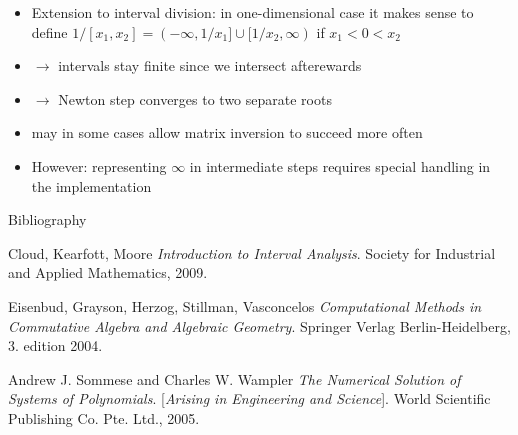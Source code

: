 \documentclass[german,10pt,xcolor=colortbl,compress]{beamer}
\begin{document}
\begin{frame}
    \begin{itemize}
        \item Extension to interval division: in one-dimensional case it makes sense to
            define $1/[x_1, x_2] = (-\infty, 1/x_1] \cup [1/x_2, \infty)$ if $x_1 < 0 <
            x_2$
        \item[]$\rightarrow$ intervals stay finite since we intersect afterewards
        \item[]$\rightarrow$ Newton step converges to two separate roots
        \item may in some cases allow matrix inversion to succeed more often
        \item However: representing $\infty$ in intermediate steps requires special
            handling in the implementation
    \end{itemize}
\end{frame}


\begin{frame}{Bibliography}
    
    \begin{thebibliography}{9}
         Cloud, Kearfott, Moore
            \textit{Introduction to Interval Analysis}.
            Society for Industrial and Applied Mathematics, 2009.


         Eisenbud, Grayson, Herzog, Stillman, Vasconcelos
            \textit{Computational Methods in Commutative Algebra and Algebraic Geometry}.
            Springer Verlag Berlin-Heidelberg, 3. edition 2004.

         Andrew J. Sommese and Charles W. Wampler
            \textit{The Numerical Solution of Systems of Polynomials}. [\textit{Arising in
            Engineering and Science}].
            World Scientific Publishing Co. Pte. Ltd., 2005.

    \end{thebibliography}
\end{frame}
\end{document}
